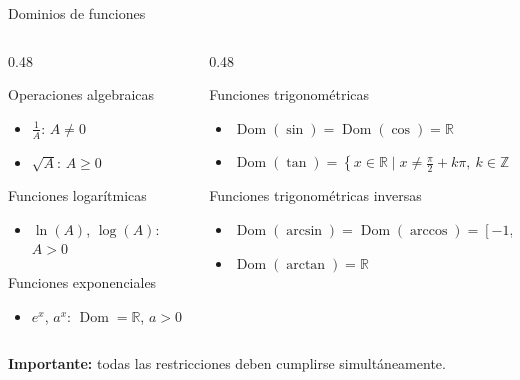 \documentclass[main.tex]{subfiles}
\begin{document}
\begin{frame}{Dominios de funciones}
\footnotesize
{}
\begin{columns}[T,onlytextwidth]
\begin{column}{0.48\textwidth}
\begin{block}{Operaciones algebraicas}
\begin{itemize}
\item $\displaystyle\frac{1}{A}$: $A\neq 0$
\item $\sqrt{A}$: $A\geq 0$
\end{itemize}
\end{block}
\begin{block}{Funciones logarítmicas}
\begin{itemize}
\item $\ln(A)$, $\log(A)$: $A>0$
\end{itemize}
\end{block}
\begin{block}{Funciones exponenciales}
\begin{itemize}
\item $e^x$, $a^x$: $\operatorname{Dom}=\mathbb{R}$, $a>0$
\end{itemize}
\end{block}
\end{column}
\begin{column}{0.48\textwidth}
\begin{block}{Funciones trigonométricas}
\begin{itemize}
\item $\operatorname{Dom}(\sin)=\operatorname{Dom}(\cos)=\mathbb{R}$
\item $\operatorname{Dom}(\tan)=\left\{x\in\mathbb{R}\mid x\neq\frac{\pi}{2}+k\pi,\ k\in\mathbb{Z}\right\}$
\end{itemize}
\end{block}
\begin{block}{Funciones trigonométricas inversas}
\begin{itemize}
\item $\operatorname{Dom}(\arcsin)=\operatorname{Dom}(\arccos)=[-1,1]$
\item $\operatorname{Dom}(\arctan)=\mathbb{R}$
\end{itemize}
\end{block}
\end{column}
\end{columns}
\vspace{0.3cm}
\centering
\textbf{Importante:} todas las restricciones deben cumplirse simultáneamente.
\end{frame}
\end{document}
